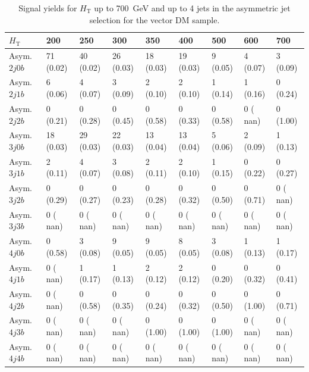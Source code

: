 \begin{table}[h]
\begin{tabular}{lllllllll}
\hline \hline
$H_\textrm{T}$                 &     200 &            250 &             300&             350&             400&             500&             600&             700  \\\hline\hline
Asym. $2j 0b$&     71 (0.02)&	   40 (0.02)&	   26 (0.03)&	   18 (0.03)&	   19 (0.03)&	    9 (0.05)&	    4 (0.07)&	    3 (0.09) \\\hline
Asym. $2j 1b$&      6 (0.06)&	    4 (0.07)&	    3 (0.09)&	    2 (0.10)&	    2 (0.10)&	    1 (0.14)&	    1 (0.16)&	    0 (0.24) \\\hline
Asym. $2j 2b$&      0 (0.21)&	    0 (0.28)&	    0 (0.45)&	    0 (0.58)&	    0 (0.33)&	    0 (0.58)&	    0 ( nan)&	    0 (1.00) \\\hline
Asym. $3j 0b$&     18 (0.03)&	   29 (0.03)&	   22 (0.03)&	   13 (0.04)&	   13 (0.04)&	    5 (0.06)&	    2 (0.09)&	    1 (0.13) \\\hline
Asym. $3j 1b$&      2 (0.11)&	    4 (0.07)&	    3 (0.08)&	    2 (0.11)&	    2 (0.10)&	    1 (0.15)&	    0 (0.22)&	    0 (0.27) \\\hline
Asym. $3j 2b$&      0 (0.29)&	    0 (0.27)&	    0 (0.23)&	    0 (0.28)&	    0 (0.32)&	    0 (0.50)&	    0 (0.71)&	    0 ( nan) \\\hline
Asym. $3j 3b$&      0 ( nan)&	    0 ( nan)&	    0 ( nan)&	    0 ( nan)&	    0 ( nan)&	    0 ( nan)&	    0 ( nan)&	    0 ( nan) \\\hline
Asym. $4j 0b$&      0 (0.58)&	    3 (0.08)&	    9 (0.05)&	    9 (0.05)&	    8 (0.05)&	    3 (0.08)&	    1 (0.13)&	    1 (0.17) \\\hline
Asym. $4j 1b$&      0 ( nan)&	    1 (0.17)&	    1 (0.13)&	    2 (0.12)&	    2 (0.12)&	    0 (0.20)&	    0 (0.32)&	    0 (0.41) \\\hline
Asym. $4j 2b$&      0 ( nan)&	    0 (0.58)&	    0 (0.35)&	    0 (0.24)&	    0 (0.32)&	    0 (0.50)&	    0 (1.00)&	    0 (0.71) \\\hline
Asym. $4j 3b$&      0 ( nan)&	    0 ( nan)&	    0 ( nan)&	    0 (1.00)&	    0 (1.00)&	    0 (1.00)&	    0 ( nan)&	    0 ( nan) \\\hline
Asym. $4j 4b$&      0 ( nan)&	    0 ( nan)&	    0 ( nan)&	    0 ( nan)&	    0 ( nan)&	    0 ( nan)&	    0 ( nan)&	    0 ( nan) \\\hline
\hline
\end{tabular}
\caption{Signal yields for $H_\textrm{T}$ up to 700~GeV and up to 4 jets in the asymmetric jet selection for the vector DM sample.}
\label{tab:sig_yields_VDM_asym}
\end{table}


